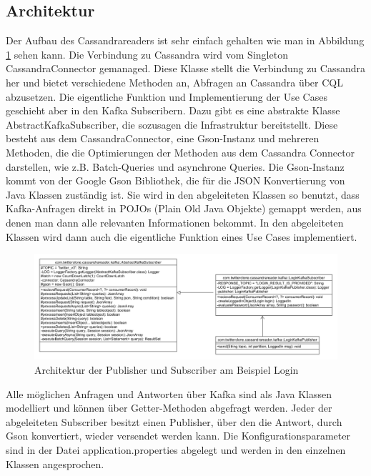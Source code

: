 \subsection{Architektur}
Der Aufbau des Cassandrareaders ist sehr einfach gehalten wie man in Abbildung \ref{fig:archCass} sehen kann. Die Verbindung zu Cassandra wird vom Singleton CassandraConnector gemanaged. Diese Klasse stellt die Verbindung zu Cassandra her und bietet verschiedene Methoden an, Abfragen an Cassandra über CQL abzusetzen. Die eigentliche Funktion und Implementierung der Use Cases geschieht aber in den Kafka Subscribern. Dazu gibt es eine abstrakte Klasse AbstractKafkaSubscriber, die sozusagen die Infrastruktur bereitstellt. Diese besteht aus dem CassandraConnector, eine Gson-Instanz und mehreren Methoden, die die Optimierungen der Methoden aus dem Cassandra Connector darstellen, wie z.B. Batch-Queries und asynchrone Queries. Die Gson-Instanz kommt von der Google Gson Bibliothek, die für die JSON Konvertierung von Java Klassen zuständig ist. Sie wird in den abgeleiteten Klassen so benutzt, dass Kafka-Anfragen direkt in POJOs (Plain Old Java Objekte) gemappt werden, aus denen man dann alle relevanten Informationen bekommt. In den abgeleiteten Klassen wird dann auch die eigentliche Funktion eines Use Cases implementiert.
\begin{figure}[htbp]
	\centering
	\includegraphics[scale=0.3]{pics/cassandrareader_architecture.png}
	\caption{Architektur der Publisher und Subscriber am Beispiel Login}
	\label{fig:archCass}
\end{figure}
Alle möglichen Anfragen und Antworten über Kafka sind als Java Klassen modelliert und können über Getter-Methoden abgefragt werden. Jeder der abgeleiteten Subscriber besitzt einen Publisher, über den die Antwort, durch Gson konvertiert, wieder versendet werden kann. Die Konfigurationsparameter sind in der Datei application.properties abgelegt und werden in den einzelnen Klassen angesprochen.


